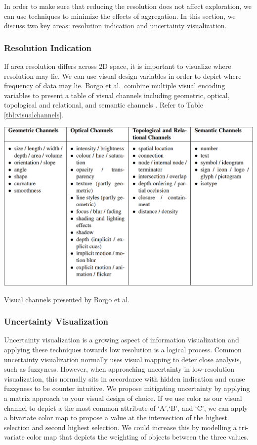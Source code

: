 In order to make sure that reducing the resolution does not affect exploration, we can use techniques to minimize the effects of aggregation. In this section, we discuss two key areas: resolution indication and uncertainty visualization.
\subsubsection*{Resolution Indication}
If area resolution differs across 2D space, it is important to visualize where resolution may lie. We can use visual design variables in order to depict where frequency of data may lie. Borgo et al.\ combine multiple visual encoding variables to present a table of visual channels including geometric, optical, topological and relational, and semantic channels \cite{borgo2013glyph}. Refer to Table \ref{tbl:visualchannels}. 

\begin{table}
\includegraphics[width=1\linewidth]{images/ch7/visualchannels}
\caption{Visual channels presented by Borgo et al.\ \cite{borgo2013glyph}} \label{tbl:visualchannels}
\end{table}
\subsubsection*{Uncertainty Visualization}
Uncertainty visualization is a growing aspect of information visualization and applying these techniques towards low resolution is a logical process. Common uncertainty visualization normally uses visual mapping to deter close analysis, such as fuzzyness. However, when approaching uncertainty in low-resolution visualization, this normally sits in accordance with hidden indication and cause fuzzyness to be counter intuitive. We propose mitigating uncertainty by applying a matrix approach to your visual design of choice. If we use color as our visual channel to depict a the most common attribute of `A',`B', and `C', we can apply a bivariate color map to propose a value at the intersection of the highest selection and second highest selection. We could increase this by modelling a tri-variate color map that depicts the weighting of objects between the three values.
